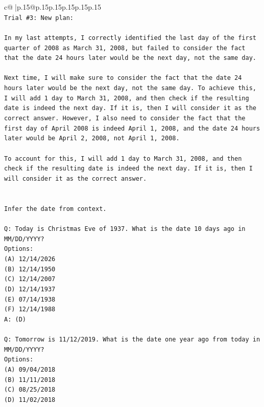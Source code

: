 \documentclass{article}
\begin{document}
{\begin{supertabular}{c@{$\;$}|p{.15\linewidth}@{}p{.15\linewidth}p{.15\linewidth}p{.15\linewidth}p{.15\linewidth}p{.15\linewidth}}
{{{\\ 
\texttt{Trial \#3: New plan: } \\
\\ 
\texttt{In my last attempts, I correctly identified the last day of the first quarter of 2008 as March 31, 2008, but failed to consider the fact that the date 24 hours later would be the next day, not the same day. } \\
\\ 
\texttt{Next time, I will make sure to consider the fact that the date 24 hours later would be the next day, not the same day. To achieve this, I will add 1 day to March 31, 2008, and then check if the resulting date is indeed the next day. If it is, then I will consider it as the correct answer. However, I also need to consider the fact that the first day of April 2008 is indeed April 1, 2008, and the date 24 hours later would be April 2, 2008, not April 1, 2008. } \\
\\ 
\texttt{To account for this, I will add 1 day to March 31, 2008, and then check if the resulting date is indeed the next day. If it is, then I will consider it as the correct answer.} \\
\\ 
\\ 
\texttt{Infer the date from context.} \\
\\ 
\texttt{Q: Today is Christmas Eve of 1937. What is the date 10 days ago in MM/DD/YYYY?} \\
\texttt{Options:} \\
\texttt{(A) 12/14/2026} \\
\texttt{(B) 12/14/1950} \\
\texttt{(C) 12/14/2007} \\
\texttt{(D) 12/14/1937} \\
\texttt{(E) 07/14/1938} \\
\texttt{(F) 12/14/1988} \\
\texttt{A: (D)} \\
\\ 
\texttt{Q: Tomorrow is 11/12/2019. What is the date one year ago from today in MM/DD/YYYY?} \\
\texttt{Options:} \\
\texttt{(A) 09/04/2018} \\
\texttt{(B) 11/11/2018} \\
\texttt{(C) 08/25/2018} \\
\texttt{(D) 11/02/2018} \\
}}}
\end{supertabular}}
\end{document}
